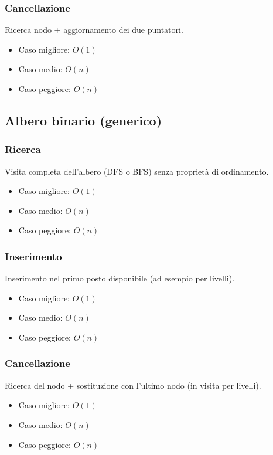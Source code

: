 \documentclass[a4paper,12pt]{article}
\begin{document}
\subsubsection{Cancellazione}
Ricerca nodo + aggiornamento dei due puntatori.
\begin{itemize}
    \item Caso migliore: $O(1)$
    \item Caso medio: $O(n)$
    \item Caso peggiore: $O(n)$
\end{itemize}


\subsection{Albero binario (generico)}

\subsubsection{Ricerca}
Visita completa dell’albero (DFS o BFS) senza proprietà di ordinamento.
\begin{itemize}
    \item Caso migliore: $O(1)$
    \item Caso medio: $O(n)$
    \item Caso peggiore: $O(n)$
\end{itemize}

\subsubsection{Inserimento}
Inserimento nel primo posto disponibile (ad esempio per livelli).
\begin{itemize}
    \item Caso migliore: $O(1)$
    \item Caso medio: $O(n)$
    \item Caso peggiore: $O(n)$
\end{itemize}

\subsubsection{Cancellazione}
Ricerca del nodo + sostituzione con l’ultimo nodo (in visita per livelli).
\begin{itemize}
    \item Caso migliore: $O(1)$
    \item Caso medio: $O(n)$
    \item Caso peggiore: $O(n)$
\end{itemize}
\end{document}
